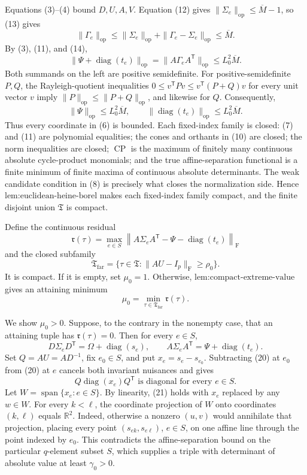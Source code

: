 Equations (3)--(4) bound \(D,U,A,V\). Equation (12) gives \(\|\Sigma_e\|_{\mathrm{op}}\leq\overline M-1\), so (13) gives
\[
\|\Gamma_e\|_{\mathrm{op}}
\leq\|\Sigma_e\|_{\mathrm{op}}
+\|\Gamma_e-\Sigma_e\|_{\mathrm{op}}
\leq\overline M.
\tag{14}
\]
By (3), (11), and (14),
\[
\|\Psi+\operatorname{diag}(t_e)\|_{\mathrm{op}}
=\|A\Gamma_eA^{\mathsf T}\|_{\mathrm{op}}
\leq L_0^2\overline M.
\tag{15}
\]
Both summands on the left are positive semidefinite. For positive-semidefinite \(P,Q\), the Rayleigh-quotient inequalities \(0\leq v^{\mathsf T}Pv\leq v^{\mathsf T}(P+Q)v\) for every unit vector \(v\) imply \(\|P\|_{\mathrm{op}}\leq\|P+Q\|_{\mathrm{op}}\), and likewise for \(Q\). Consequently,
\[
\|\Psi\|_{\mathrm{op}}\leq L_0^2\overline M,
\qquad
\|\operatorname{diag}(t_e)\|_{\mathrm{op}}
\leq L_0^2\overline M.
\tag{16}
\]
Thus every coordinate in (6) is bounded. Each fixed-index family is closed: (7) and (11) are polynomial equalities; the cones and orthants in (10) are closed; the norm inequalities are closed; \(\operatorname{CP}\) is the maximum of finitely many continuous absolute cycle-product monomials; and the true affine-separation functional is a finite minimum of finite maxima of continuous absolute determinants. The weak candidate condition in (8) is precisely what closes the normalization side. Hence \(\text{lem:euclidean-heine-borel}\) makes each fixed-index family compact, and the finite disjoint union \(\mathfrak T\) is compact.

Define the continuous residual
\[
\mathfrak r(\tau)=
\max_{e\in S}
\left\|A\Sigma_eA^{\mathsf T}
-\Psi-\operatorname{diag}(t_e)\right\|_{\mathrm F}
\tag{17}
\]
and the closed subfamily
\[
\mathfrak T_{\mathrm{far}}
=\{\tau\in\mathfrak T:\|AU-I_p\|_{\mathrm F}\geq\rho_0\}.
\tag{18}
\]
It is compact. If it is empty, set \(\mu_0=1\). Otherwise, \(\text{lem:compact-extreme-value}\) gives an attaining minimum
\[
\mu_0=\min_{\tau\in\mathfrak T_{\mathrm{far}}}\mathfrak r(\tau).
\tag{19}
\]

We show \(\mu_0>0\). Suppose, to the contrary in the nonempty case, that an attaining tuple has \(\mathfrak r(\tau)=0\). Then for every \(e\in S\),
\[
D\Sigma_eD^{\mathsf T}=\Omega+\operatorname{diag}(s_e),
\qquad
A\Sigma_eA^{\mathsf T}=\Psi+\operatorname{diag}(t_e).
\tag{20}
\]
Set \(Q=AU=AD^{-1}\), fix \(e_0\in S\), and put \(x_e=s_e-s_{e_0}\). Subtracting (20) at \(e_0\) from (20) at \(e\) cancels both invariant nuisances and gives
\[
Q\operatorname{diag}(x_e)Q^{\mathsf T}
\text{ is diagonal for every }e\in S.
\tag{21}
\]
Let \(W=\operatorname{span}\{x_e:e\in S\}\). By linearity, (21) holds with \(x_e\) replaced by any \(w\in W\). For every \(k<\ell\), the coordinate projection of \(W\) onto coordinates \((k,\ell)\) equals \(\mathbb R^2\). Indeed, otherwise a nonzero \((u,v)\) would annihilate that projection, placing every point \((s_{ek},s_{e\ell})\), \(e\in S\), on one affine line through the point indexed by \(e_0\). This contradicts the affine-separation bound on the particular \(q\)-element subset \(S\), which supplies a triple with determinant of absolute value at least \(\gamma_0>0\).

